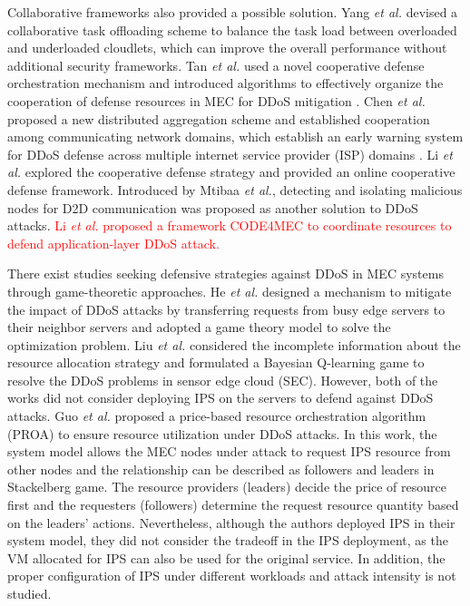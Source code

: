 \documentclass[10pt,journal, compsoc]{IEEEtran}
\begin{document}
Collaborative frameworks also provided a possible solution. Yang \emph{et al.} devised a collaborative task offloading scheme to balance the task load between overloaded and underloaded cloudlets, which can improve the overall performance without additional security frameworks\cite{Yang}. Tan \emph{et al.} used a novel cooperative defense orchestration mechanism and introduced algorithms to effectively organize the cooperation of defense resources in MEC for DDoS mitigation \cite{Tan}. Chen \emph{et al.} proposed a new distributed aggregation scheme and established cooperation among communicating network domains, which establish an early warning system for DDoS defense across multiple internet service provider (ISP) domains \cite{Chen}. Li \emph{et al.} explored the cooperative defense strategy and provided an online cooperative defense framework\cite{Li}. Introduced by Mtibaa \emph{et al.}, detecting and isolating malicious nodes for D2D communication was proposed as another solution to DDoS attacks\cite{Mtibaa}. \textcolor{red}{Li \emph{et al.} proposed a framework CODE4MEC to coordinate resources to defend application-layer DDoS attack.\cite{Li2}} 

There exist studies seeking defensive strategies against DDoS in MEC systems through game-theoretic approaches. He \emph{et al.} designed a mechanism to mitigate the impact of DDoS attacks by transferring requests from busy edge servers to their neighbor servers and adopted a game theory model to solve the optimization problem\cite{He}.  Liu \emph{et al.} considered the incomplete information about the resource allocation strategy and formulated a Bayesian Q-learning game to resolve the DDoS problems in sensor edge cloud (SEC)\cite{Liu3}. However, both of the works did not consider deploying IPS on the servers to defend against DDoS attacks. Guo \emph{et al.} proposed a price-based resource orchestration algorithm (PROA) to ensure resource utilization under DDoS attacks\cite{Guo2}. In this work, the system model allows the MEC nodes under attack to request IPS resource from other nodes and the relationship can be described as followers and leaders in Stackelberg game. The resource providers (leaders) decide the price of resource first and the requesters (followers) determine the request resource quantity based on the leaders' actions. Nevertheless, although the authors deployed IPS in their system model, they did not consider the tradeoff in the IPS deployment, as the VM allocated for IPS can also be used for the original service. In addition, the proper configuration of IPS under different workloads and attack intensity is not studied. 
\end{document}
